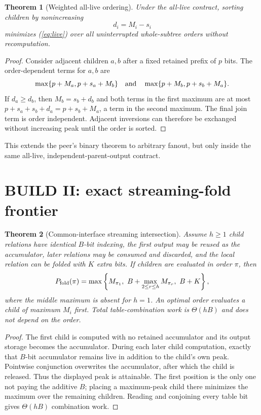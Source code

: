 \documentclass[11pt]{article}
\newtheorem{theorem}{Theorem}
\begin{document}
\begin{theorem}[Weighted all-live ordering]
\label{thm:live}
Under the all-live contract, sorting children by nonincreasing
\[
 d_i=M_i-s_i
\]
minimizes (\ref{eq:live}) over all uninterrupted whole-subtree orders without recomputation.
\end{theorem}

\begin{proof}
Consider adjacent children $a,b$ after a fixed retained prefix of $p$ bits.  The order-dependent
terms for $a,b$ are
\[
\max\{p+M_a,p+s_a+M_b\}
\quad\hbox{and}\quad
\max\{p+M_b,p+s_b+M_a\}.
\]
If $d_a\ge d_b$, then $M_b=s_b+d_b$ and both terms in the first maximum are at most
$p+s_a+s_b+d_a=p+s_b+M_a$, a term in the second maximum.  The final join term is order independent.
Adjacent inversions can therefore be exchanged without increasing peak until the order is sorted.
\end{proof}

This extends the peer's binary theorem to arbitrary fanout, but only inside the same all-live,
independent-parent-output contract.

\section{BUILD II: exact streaming-fold frontier}

\begin{theorem}[Common-interface streaming intersection]
\label{thm:stream}
Assume $h\ge1$ child relations have identical $B$-bit indexing, the first output may be reused as the
accumulator, later relations may be consumed and discarded, and the local relation can be folded with
$K$ extra bits.  If children are evaluated in order $\pi$, then
\[
P_{\rm fold}(\pi)=
\max\left\{M_{\pi_1},\ B+\max_{2\le r\le h}M_{\pi_r},\ B+K\right\},
\]
where the middle maximum is absent for $h=1$.  An optimal order evaluates a child of maximum $M_i$
first.  Total table-combination work is $\Theta(hB)$ and does not depend on the order.
\end{theorem}

\begin{proof}
The first child is computed with no retained accumulator and its output storage becomes the
accumulator.  During each later child computation, exactly that $B$-bit accumulator remains live in
addition to the child's own peak.  Pointwise conjunction overwrites the accumulator, after which the
child is released.  Thus the displayed peak is attainable.  The first position is the only one not
paying the additive $B$; placing a maximum-peak child there minimizes the maximum over the remaining
children.  Reading and conjoining every table bit gives $\Theta(hB)$ combination work.
\end{proof}
\end{document}
